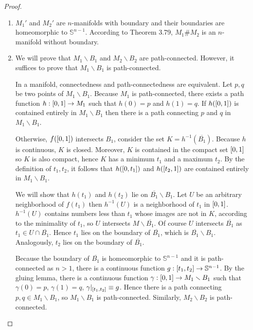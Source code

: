 \begin{proof}
	\begin{enumerate}[label={(\alph*)}]
		\item $M_{1}'$ and $M_{2}'$ are $n$-manifolds with boundary and their boundaries are homeomorphic to $\mathbb{S}^{n-1}$. According to Theorem 3.79, $M_{1} \# M_{2}$ is an $n$-manifold without boundary.
		\item We will prove that $M_{1}\smallsetminus B_{1}$ and $M_{2}\smallsetminus B_{2}$ are path-connected. However, it suffices to prove that $M_{1}\smallsetminus B_{1}$ is path-connected.

		      In a manifold, connectedness and path-connectedness are equivalent. Let $p, q$ be two points of $M_{1}\smallsetminus B_{1}$. Because $M_{1}$ is path-connected, there exists a path function $h: \left[{0, 1}\right] \to M_{1}$ such that $h(0) = p$ and $h(1) = q$. If $h(\left[{0, 1}\right])$ is contained entirely in $M_{1}\smallsetminus B_{1}$ then there is a path connecting $p$ and $q$ in $M_{1}\smallsetminus B_{1}$.

		      Otherwise, $f(\left[{0, 1}\right])$ intersects $B_{1}$, consider the set $K = h^{-1}(\overline{B_{1}})$. Because $h$ is continuous, $K$ is closed. Moreover, $K$ is contained in the compact set $\left[{0, 1}\right]$ so $K$ is also compact, hence $K$ has a minimum $t_{1}$ and a maximum $t_{2}$. By the definition of $t_{1}, t_{2}$, it follows that $h(\left[{0, t_{1}}\right])$ and $h(\left[{t_{2}, 1}\right])$ are contained entirely in $M_{1}\smallsetminus B_{1}$.

		      We will show that $h(t_{1})$ and $h(t_{2})$ lie on $\overline{B_{1}}\smallsetminus B_{1}$. Let $U$ be an arbitrary neighborhood of $f(t_{1})$ then $h^{-1}(U)$ is a neighborhood of $t_{1}$ in $\left[{0, 1}\right]$. $h^{-1}(U)$ contains numbers less than $t_{1}$ whose images are not in $K$, according to the minimality of $t_{1}$, so $U$ intersects $M\smallsetminus \overline{B_{1}}$. Of course $U$ intersects $\overline{B_{1}}$ as $t_{1} \in U \cap \overline{B_{1}}$. Hence $t_{1}$ lies on the boundary of $\overline{B_{1}}$, which is $\overline{B_{1}}\smallsetminus B_{1}$. Analogously, $t_{2}$ lies on the boundary of $\overline{B_{1}}$.

		      Because the boundary of $\overline{B_{1}}$ is homeomorphic to $\mathbb{S}^{n-1}$ and it is path-connected as $n > 1$, there is a continuous function $g: \left[{t_{1}, t_{2}}\right] \to \mathbb{S}^{n-1}$. By the gluing lemma, there is a continuous function $\gamma: \left[{0, 1}\right] \to M_{1}\smallsetminus B_{1}$ such that $\gamma(0) = p$, $\gamma(1) = q$, $\gamma\vert_{\left[{t_{1}, t_{2}}\right]} \equiv g$. Hence there is a path connecting $p, q\in M_{1}\smallsetminus B_{1}$, so $M_{1}\smallsetminus B_{1}$ is path-connected. Similarly, $M_{2}\smallsetminus B_{2}$ is path-connected.


\end{enumerate}
\end{proof}
